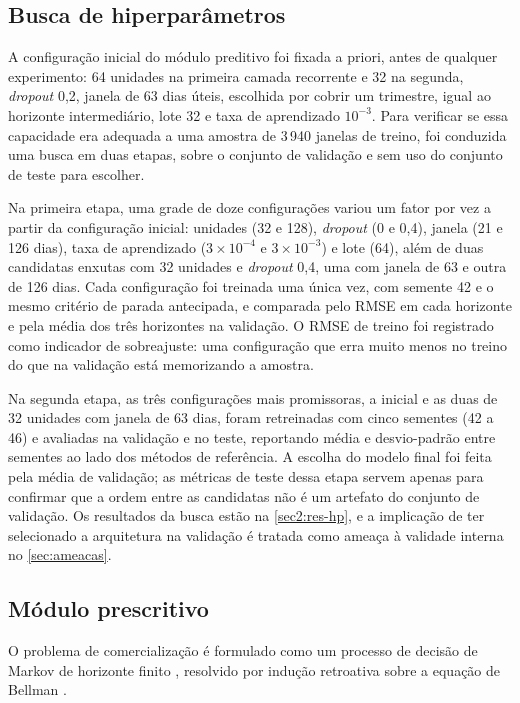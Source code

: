 \subsection{Busca de hiperparâmetros}\label{sec3:busca-hp}

A configuração inicial do módulo preditivo foi fixada a priori, antes de qualquer experimento: 64 unidades na primeira camada recorrente e 32 na segunda, \textit{dropout} 0,2, janela de 63 dias úteis, escolhida por cobrir um trimestre, igual ao horizonte intermediário, lote 32 e taxa de aprendizado $10^{-3}$. Para verificar se essa capacidade era adequada a uma amostra de 3\,940 janelas de treino, foi conduzida uma busca em duas etapas, sobre o conjunto de validação e sem uso do conjunto de teste para escolher.

Na primeira etapa, uma grade de doze configurações variou um fator por vez a partir da configuração inicial: unidades (32 e 128), \textit{dropout} (0 e 0,4), janela (21 e 126 dias), taxa de aprendizado ($3 \times 10^{-4}$ e $3 \times 10^{-3}$) e lote (64), além de duas candidatas enxutas com 32 unidades e \textit{dropout} 0,4, uma com janela de 63 e outra de 126 dias. Cada configuração foi treinada uma única vez, com semente 42 e o mesmo critério de parada antecipada, e comparada pelo RMSE em cada horizonte e pela média dos três horizontes na validação. O RMSE de treino foi registrado como indicador de sobreajuste: uma configuração que erra muito menos no treino do que na validação está memorizando a amostra.

Na segunda etapa, as três configurações mais promissoras, a inicial e as duas de 32 unidades com janela de 63 dias, foram retreinadas com cinco sementes (42 a 46) e avaliadas na validação e no teste, reportando média e desvio-padrão entre sementes ao lado dos métodos de referência. A escolha do modelo final foi feita pela média de validação; as métricas de teste dessa etapa servem apenas para confirmar que a ordem entre as candidatas não é um artefato do conjunto de validação. Os resultados da busca estão na \autoref{sec2:res-hp}, e a implicação de ter selecionado a arquitetura na validação é tratada como ameaça à validade interna no \autoref{sec:ameacas}.

\subsection{Módulo prescritivo}

O problema de comercialização é formulado como um processo de decisão de Markov de horizonte finito \cite{Puterman1994}, resolvido por indução retroativa sobre a equação de Bellman \cite{Bellman1957}.

